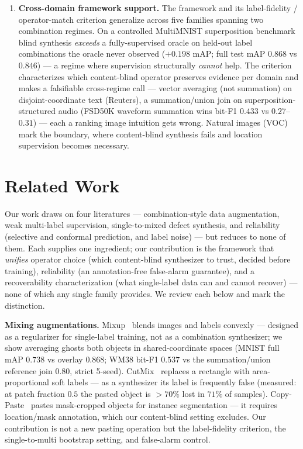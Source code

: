 \documentclass[11pt]{article}
\begin{document}
\begin{enumerate}
  dominant FAR fixer; naive-Bayes rejection closes the OOD tail, Sec.~\ref{sec:crossover}).
\item \textbf{Cross-domain framework support.} The framework and its label-fidelity
  / operator-match criterion generalize across five families spanning two combination
  regimes. On a controlled MultiMNIST superposition benchmark blind synthesis
  \emph{exceeds} a fully-supervised oracle on held-out label combinations the oracle
  never observed ($+0.198$ mAP; full test mAP $0.868$ vs $0.846$) --- a regime where
  supervision structurally \emph{cannot} help. The criterion characterizes which
  content-blind operator preserves evidence per domain and makes a falsifiable
  cross-regime call --- vector averaging (not summation) on disjoint-coordinate text
  (Reuters), a summation/union join on superposition-structured audio (FSD50K
  waveform summation wins bit-F1 $0.433$ vs $0.27$--$0.31$) --- each a ranking image
  intuition gets wrong. Natural images (VOC) mark the boundary, where content-blind
  synthesis fails and location supervision becomes necessary.
\end{enumerate}

\section{Related Work}\label{sec:related}

Our work draws on four literatures --- combination-style data augmentation, weak
multi-label supervision, single-to-mixed defect synthesis, and reliability (selective
and conformal prediction, and label noise) --- but reduces to none of them. Each
supplies one ingredient; our contribution is the framework that \emph{unifies} operator
choice (which content-blind synthesizer to trust, decided before training), reliability
(an annotation-free false-alarm guarantee), and a recoverability characterization (what
single-label data can and cannot recover) --- none of which any single family provides.
We review each below and mark the distinction.

\textbf{Mixing augmentations.} Mixup~\cite{zhang2018mixup} blends images
and labels convexly --- designed as a regularizer for single-label
training, not as a combination synthesizer; we show averaging ghosts both
objects in shared-coordinate spaces (MNIST full mAP $0.738$ vs overlay
$0.868$; WM38 bit-F1 $0.537$ vs the summation/union reference join $0.80$, strict
5-seed).
CutMix~\cite{yun2019cutmix} replaces a rectangle with area-proportional
soft labels --- as a synthesizer its label is frequently false (measured:
at patch fraction $0.5$ the pasted object is $>70\%$ lost in $71\%$ of
samples). Copy-Paste~\cite{ghiasi2021copypaste} pastes mask-cropped
objects for instance segmentation --- it requires location/mask
annotation, which our content-blind setting excludes. Our contribution is
not a new pasting operation but the label-fidelity criterion, the
single-to-multi bootstrap setting, and false-alarm control.
\end{document}
